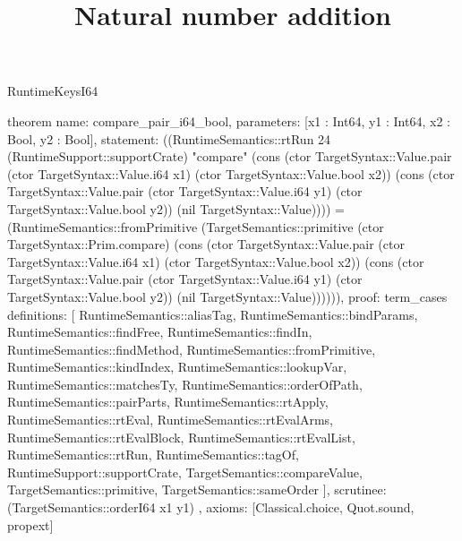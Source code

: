 \begin{lexlean}{RuntimeKeysI64}
\title{Natural number addition}
\begin{semanticmodule}
theorem{
  name: compare_pair_i64_bool,
  parameters: [x1 : Int64, y1 : Int64, x2 : Bool, y2 : Bool],
  statement: ((RuntimeSemantics::rtRun 24 (RuntimeSupport::supportCrate) "compare" (cons (ctor TargetSyntax::Value.pair (ctor TargetSyntax::Value.i64 x1) (ctor TargetSyntax::Value.bool x2)) (cons (ctor TargetSyntax::Value.pair (ctor TargetSyntax::Value.i64 y1) (ctor TargetSyntax::Value.bool y2)) (nil TargetSyntax::Value)))) = (RuntimeSemantics::fromPrimitive (TargetSemantics::primitive (ctor TargetSyntax::Prim.compare) (cons (ctor TargetSyntax::Value.pair (ctor TargetSyntax::Value.i64 x1) (ctor TargetSyntax::Value.bool x2)) (cons (ctor TargetSyntax::Value.pair (ctor TargetSyntax::Value.i64 y1) (ctor TargetSyntax::Value.bool y2)) (nil TargetSyntax::Value)))))),
  proof: term_cases{
    definitions: [
      RuntimeSemantics::aliasTag,
      RuntimeSemantics::bindParams,
      RuntimeSemantics::findFree,
      RuntimeSemantics::findIn,
      RuntimeSemantics::findMethod,
      RuntimeSemantics::fromPrimitive,
      RuntimeSemantics::kindIndex,
      RuntimeSemantics::lookupVar,
      RuntimeSemantics::matchesTy,
      RuntimeSemantics::orderOfPath,
      RuntimeSemantics::pairParts,
      RuntimeSemantics::rtApply,
      RuntimeSemantics::rtEval,
      RuntimeSemantics::rtEvalArms,
      RuntimeSemantics::rtEvalBlock,
      RuntimeSemantics::rtEvalList,
      RuntimeSemantics::rtRun,
      RuntimeSemantics::tagOf,
      RuntimeSupport::supportCrate,
      TargetSemantics::compareValue,
      TargetSemantics::primitive,
      TargetSemantics::sameOrder
    ],
    scrutinee: (TargetSemantics::orderI64 x1 y1)
  },
  axioms: [Classical.choice, Quot.sound, propext]
}


\end{semanticmodule}
\end{lexlean}
